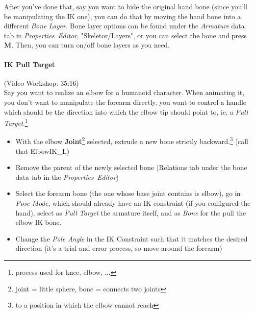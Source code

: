 \documentclass{article}
\begin{document}
After you've done that, say you want to hide the original hand bone (since you'll be manipulating the IK one), you can do that by moving the hand bone into a different \textit{Bone Layer}. Bone layer
options can be found under the \textit{Armature} data tab in \mbox{\textit{Properties Editor}}, "Skeletor/Layers", or you can select the bone and press \textbf{M}. Then, you can turn on/off bone layers
as you need.

\paragraph{IK Pull Target}
(Video Workshop: 35:16)\\
Say you want to realize an elbow for a humanoid character. When animating it, you don't want to manipulate the forearm directly, you want to control a handle which should be the direction into which the 
elbow tip should point to, ie, a \textit{Pull Target}.\footnote{process used for knee, elbow, ...}
\begin{itemize}[noitemsep, topsep=0pt]
    \item With the elbow \textbf{Joint}\footnote{joint = little sphere, bone = connects two joints} selected, extrude a new bone strictly backward.\footnote{to a position in which the elbow cannot reach} (call that ElbowIK\_L)
    \item Remove the parent of the newly selected bone (Relations tab under the bone data tab in the \mbox{\textit{Properties Editor}})
    \item Select the forearm bone (the one whose base joint contains is elbow), go in \textit{Pose Mode}, which should already have an IK constraint (if you configured the hand), 
    select as \textit{Pull Target} the armature itself, and as \textit{Bone} for the pull the elbow IK bone.
    \item Change the \textit{Pole Angle} in the IK Constraint such that it matches the desired direction (it's a trial and error process, so move around the forearm)
\end{itemize}
\end{document}
